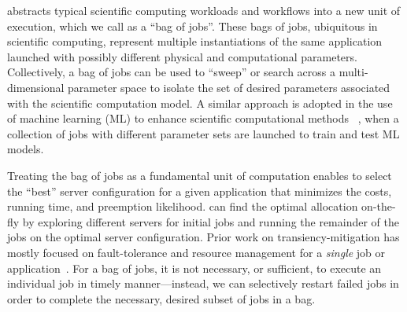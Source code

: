 




\sysname abstracts typical scientific computing workloads and workflows into a new unit of execution, which we call as a ``bag of jobs''. 
These bags of jobs, ubiquitous in scientific computing, represent multiple instantiations of the same application launched with possibly different physical and computational parameters. 
Collectively, a bag of jobs can be used to ``sweep'' or search across a multi-dimensional parameter space to isolate the set of desired parameters associated with the scientific computation model.
A similar approach is adopted in the use of machine learning (ML) to enhance scientific computational methods ~\cite{ml.atomic2017,melko2017,sam2017,fu2017,long2015machine, ferguson2017machine,ward2018matminer}, when a collection of jobs with different  parameter sets are launched to train and test ML models.



%
Treating the bag of jobs as a fundamental unit of computation enables \sysname to select the ``best'' server configuration for a given application that minimizes the costs, running time, and preemption likelihood.
\sysname can find the optimal allocation on-the-fly by exploring different servers for initial jobs and running the remainder of the jobs on the optimal server configuration. 
%
Prior work on transiency-mitigation has mostly focused on fault-tolerance and resource management for a \emph{single} job or application~\cite{spoton, exosphere, flint, marathe2014exploiting}. 
For a bag of jobs, it is not necessary, or sufficient, to execute an individual job in timely manner---instead, we can selectively restart failed jobs in order to complete the necessary, desired subset of jobs in a bag.


